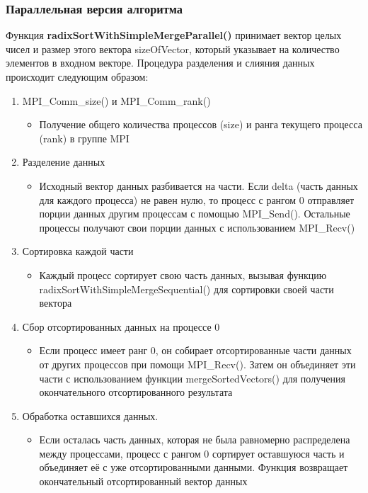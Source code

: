 \documentclass[a4paper, 14pt]{article}
\theoremstyle{plain}
\begin{document}
\subsubsection*{\centering Параллельная версия алгоритма}
Функция \textbf{radixSortWithSimpleMergeParallel()} принимает вектор целых чисел и размер этого вектора sizeOfVector, который указывает на количество элементов в входном векторе. Процедура разделения и слияния данных происходит следующим образом:
\begin{enumerate}[leftmargin=3em]
	\item MPI\_Comm\_size() и MPI\_Comm\_rank()
	\begin{itemize}
		\setlength\itemsep{0cm}
		\item Получение общего количества процессов (size) и ранга текущего процесса (rank) в группе MPI
	\end{itemize}
	
		\item Разделение данных
	\begin{itemize}
		\setlength\itemsep{0cm}
		\item Исходный вектор данных разбивается на части. Если delta (часть данных для каждого процесса) не равен нулю, то процесс с рангом 0 отправляет порции данных другим процессам с помощью MPI\_Send(). Остальные процессы получают свои порции данных с использованием MPI\_Recv()
	\end{itemize}
	
		\item Сортировка каждой части
	\begin{itemize}
		\setlength\itemsep{0cm}
		\item Каждый процесс сортирует свою часть данных, вызывая функцию radixSortWithSimpleMergeSequential() для сортировки своей части вектора
	\end{itemize}
	
		\item Сбор отсортированных данных на процессе 0
	\begin{itemize}
		\setlength\itemsep{0cm}
		\item Если процесс имеет ранг 0, он собирает отсортированные части данных от других процессов при помощи MPI\_Recv(). Затем он объединяет эти части с использованием функции mergeSortedVectors() для получения окончательного отсортированного результата
	\end{itemize}
	
		\item Обработка оставшихся данных.
	\begin{itemize}
		\setlength\itemsep{0cm}
		\item Если осталась часть данных, которая не была равномерно распределена между процессами, процесс с рангом 0 сортирует оставшуюся часть и объединяет её с уже отсортированными данными. Функция возвращает окончательный отсортированный вектор данных
	\end{itemize}
	
	\end{enumerate}
	
\end{document}
